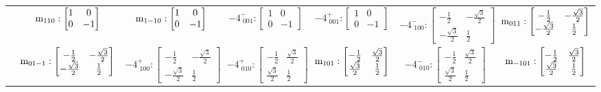 \documentclass[fleqn,8pt,landscape]{jsarticle}
\begin{document}
\begin{longtable}{ccccccc}
& $ {\rm m}_{110}:\begin{bmatrix} 1 & 0 \\ 0 & -1 \end{bmatrix} $ & $ {\rm m}_{1-10}:\begin{bmatrix} 1 & 0 \\ 0 & -1 \end{bmatrix} $ & $ -4^{-}_{\,\,001}:\begin{bmatrix} 1 & 0 \\ 0 & -1 \end{bmatrix} $ & $ -4^{+}_{\,\,001}:\begin{bmatrix} 1 & 0 \\ 0 & -1 \end{bmatrix} $ & $ -4^{-}_{\,\,100}:\begin{bmatrix} - \frac{1}{2} & - \frac{\sqrt{3}}{2} \\ - \frac{\sqrt{3}}{2} & \frac{1}{2} \end{bmatrix} $ & $ {\rm m}_{011}:\begin{bmatrix} - \frac{1}{2} & - \frac{\sqrt{3}}{2} \\ - \frac{\sqrt{3}}{2} & \frac{1}{2} \end{bmatrix} $ \\
& $ {\rm m}_{01-1}:\begin{bmatrix} - \frac{1}{2} & - \frac{\sqrt{3}}{2} \\ - \frac{\sqrt{3}}{2} & \frac{1}{2} \end{bmatrix} $ & $ -4^{+}_{\,\,100}:\begin{bmatrix} - \frac{1}{2} & - \frac{\sqrt{3}}{2} \\ - \frac{\sqrt{3}}{2} & \frac{1}{2} \end{bmatrix} $ & $ -4^{+}_{\,\,010}:\begin{bmatrix} - \frac{1}{2} & \frac{\sqrt{3}}{2} \\ \frac{\sqrt{3}}{2} & \frac{1}{2} \end{bmatrix} $ & $ {\rm m}_{101}:\begin{bmatrix} - \frac{1}{2} & \frac{\sqrt{3}}{2} \\ \frac{\sqrt{3}}{2} & \frac{1}{2} \end{bmatrix} $ & $ -4^{-}_{\,\,010}:\begin{bmatrix} - \frac{1}{2} & \frac{\sqrt{3}}{2} \\ \frac{\sqrt{3}}{2} & \frac{1}{2} \end{bmatrix} $ & $ {\rm m}_{-101}:\begin{bmatrix} - \frac{1}{2} & \frac{\sqrt{3}}{2} \\ \frac{\sqrt{3}}{2} & \frac{1}{2} \end{bmatrix} $ \\ \hline

\end{longtable}
\end{document}
